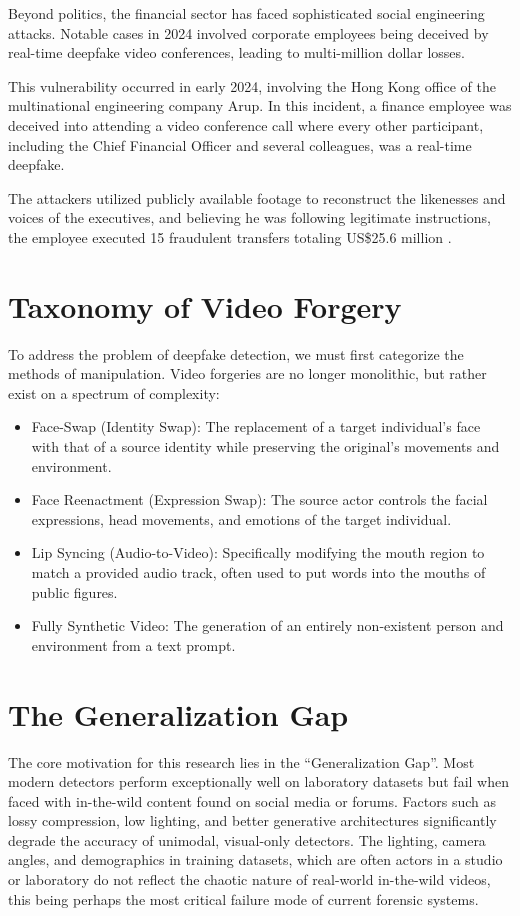 \documentclass[12pt,a4paper]{report}
\begin{document}
Beyond politics, the financial sector has faced sophisticated social engineering attacks. Notable cases in 2024 involved corporate employees being deceived by real-time deepfake video conferences, leading to multi-million dollar losses. 

This vulnerability occurred in early 2024, involving the Hong Kong office of the multinational engineering company Arup. In this incident, a finance employee was deceived into attending a video conference call where every other participant, including the Chief Financial Officer and several colleagues, was a real-time deepfake.

The attackers utilized publicly available footage to reconstruct the likenesses and voices of the executives, and believing he was following legitimate instructions, the employee executed 15 fraudulent transfers totaling US\$25.6 million \cite{arup2024deepfake}. 



\section{Taxonomy of Video Forgery}
To address the problem of deepfake detection, we must first categorize the methods of manipulation. Video forgeries are no longer monolithic, but rather exist on a spectrum of complexity:
\begin{itemize}
    \item Face-Swap (Identity Swap): The replacement of a target individual’s face with that of a source identity while preserving the original’s movements and environment.
    \item Face Reenactment (Expression Swap): The source actor controls the facial expressions, head movements, and emotions of the target individual.
    \item Lip Syncing (Audio-to-Video): Specifically modifying the mouth region to match a provided audio track, often used to put words into the mouths of public figures.
    \item Fully Synthetic Video: The generation of an entirely non-existent person and environment from a text prompt.
\end{itemize}


\section{The Generalization Gap}
The core motivation for this research lies in the ``Generalization Gap''. Most modern detectors perform exceptionally well on laboratory datasets but fail when faced with in-the-wild content found on social media or forums. Factors such as lossy compression, low lighting, and better generative architectures significantly degrade the accuracy of unimodal, visual-only detectors. The lighting, camera angles, and demographics in training datasets, which are often actors in a studio or laboratory do not reflect the chaotic nature of real-world in-the-wild videos, this being perhaps the most critical failure mode of current forensic systems.
\end{document}
